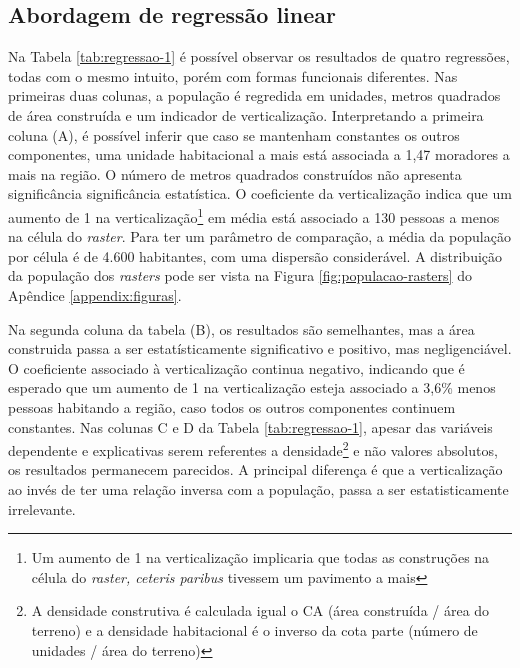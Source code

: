 \subsection{Abordagem de regressão linear}

{\tiny

}

Na Tabela \ref{tab:regressao-1} é possível observar os resultados de quatro regressões, todas com o mesmo intuito, porém com formas funcionais diferentes. Nas primeiras duas colunas, a população é regredida em unidades, metros quadrados de área construída e um indicador de verticalização. Interpretando a primeira coluna (A), é possível inferir que caso se mantenham constantes os outros componentes, uma unidade habitacional a mais está associada a 1,47 moradores a mais na região. O número de metros quadrados construídos não apresenta significância significância estatística. O coeficiente da verticalização indica que um aumento de 1 na verticalização\footnote{Um aumento de 1 na verticalização implicaria que todas as construções na célula do \textit{raster, ceteris paribus} tivessem um pavimento a mais} em média está associado a 130 pessoas a menos na célula do \textit{raster}. Para ter um parâmetro de comparação, a média da população por célula é de 4.600 habitantes, com uma dispersão considerável. A distribuição da população dos \textit{rasters} pode ser vista na Figura \ref{fig:populacao-rasters} do Apêndice \ref{appendix:figuras}. 

Na segunda coluna da tabela (B),  os resultados são semelhantes, mas a área construida passa a ser estatísticamente significativo e positivo, mas negligenciável. O coeficiente associado à verticalização continua negativo, indicando que é esperado que um aumento de 1 na verticalização esteja associado a 3,6\% menos pessoas habitando a região, caso todos os outros componentes continuem constantes. Nas colunas C e D da Tabela \ref{tab:regressao-1}, apesar das variáveis dependente e explicativas serem referentes a densidade\footnote{A densidade construtiva é calculada igual o CA (área construída / área do terreno) e a densidade habitacional é o inverso da cota parte (número de unidades / área do terreno)} e não valores absolutos, os resultados permanecem parecidos. A principal diferença é que a verticalização ao invés de ter uma relação inversa com a população, passa a ser estatisticamente irrelevante.

